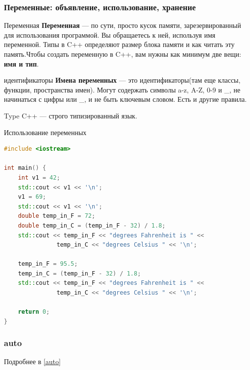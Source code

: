 \subsubsection{Переменные: объявление, использование, хранение}
\begin{definition}{Переменная}{}
\textbf{Переменная} --- по сути, просто кусок памяти, зарезервированный для использования программой. Вы обращаетесь к ней, используя имя переменной. Типы в  C++ определяют размер блока памяти и как читать эту память.Чтобы создать переменную в C++, вам нужны как минимум две вещи: \textbf{имя и тип}.
\end{definition}
\begin{definition}{идентификаторы}{}
  \textbf{Имена переменных} — это идентификаторы(там еще классы, функции, пространства имен). Могут содержать символы a-z, A-Z, 0-9 и \_, не начинаться с цифры или \_, и не быть ключевым словом. Есть и другие правила.
\end{definition}
\begin{definition}{Type}{}
  C++ — строго типизированный язык.
\end{definition}
\begin{implementation}{Использование переменных}{}
\begin{lstlisting}[language=C++]
#include <iostream>

int main() {
    int v1 = 42;
    std::cout << v1 << '\n';
    v1 = 69;
    std::cout << v1 << '\n';
    double temp_in_F = 72;
    double temp_in_C = (temp_in_F - 32) / 1.8;
    std::cout << temp_in_F << "degrees Fahrenheit is " <<
               temp_in_C << "degrees Celsius " << '\n';

    temp_in_F = 95.5;
    temp_in_C = (temp_in_F - 32) / 1.8;
    std::cout << temp_in_F << "degrees Fahrenheit is " <<
               temp_in_C << "degrees Celsius " << '\n';

    return 0;
}
\end{lstlisting}
\end{implementation}
\subsubsection*{auto}
Подробнее в \ref{auto}
